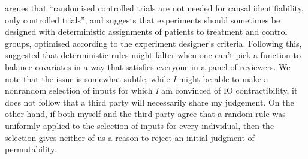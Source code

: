 \citet{kasy_why_2016} argues that ``randomised controlled trials are not needed for causal identifiability, only controlled trials'', and suggests that experiments should sometimes be designed with deterministic assignments of patients to treatment and control groups, optimised according to the experiment designer's criteria. Following this, \citet{banerjee_theory_2020} suggested that deterministic rules might falter when one can't pick a function to balance covariates in a way that satisfies everyone in a panel of reviewers. We note that the issue is somewhat subtle; while \emph{I} might be able to make a nonrandom selection of inputs for which \emph{I} am convinced of IO contractibility, it does not follow that a third party will necessarily share my judgement. On the other hand, if both myself and the third party agree that a random rule was uniformly applied to the selection of inputs for every individual, then the selection gives neither of us a reason to reject an initial judgment of permutability.





